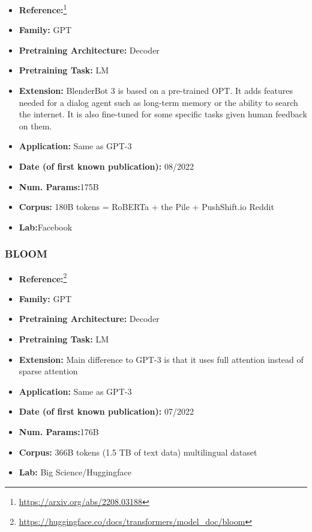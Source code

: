 \documentclass{article}
\begin{document}
            \begin{itemize}
                \item \textbf{Reference:}\footnote{\url{https://arxiv.org/abs/2208.03188}}\cite{shuster2022blenderbot}
                \item \textbf{Family:} GPT 
                \item \textbf{Pretraining Architecture:} Decoder
                \item \textbf{Pretraining Task:} LM
                \item \textbf{Extension:} BlenderBot 3 is based on a pre-trained OPT. It adds features needed for a dialog agent such as long-term memory or the ability to search the internet. It is also fine-tuned for some specific tasks given human feedback on them.  
                \item \textbf{Application:} Same as GPT-3
                \item \textbf{Date (of first known publication):} 08/2022
                \item \textbf{Num. Params:}175B
                \item \textbf{Corpus:} 180B tokens = RoBERTa + the Pile + PushShift.io Reddit
                \item \textbf{Lab:}Facebook
            \end{itemize}

\subsubsection{BLOOM}
            \begin{itemize}
                \item \textbf{Reference:}\footnote{\url{https://huggingface.co/docs/transformers/model_doc/bloom}}
                \item \textbf{Family:} GPT 
                \item \textbf{Pretraining Architecture:} Decoder
                \item \textbf{Pretraining Task:} LM
                \item \textbf{Extension:} Main difference to GPT-3 is that it uses full attention instead of sparse attention  
                \item \textbf{Application:} Same as GPT-3
                \item \textbf{Date (of first known publication):} 07/2022
                \item \textbf{Num. Params:}176B
                \item \textbf{Corpus:} 366B tokens (1.5 TB of text data) multilingual dataset
                \item \textbf{Lab:} Big Science/Huggingface
            \end{itemize}
            
\end{document}
